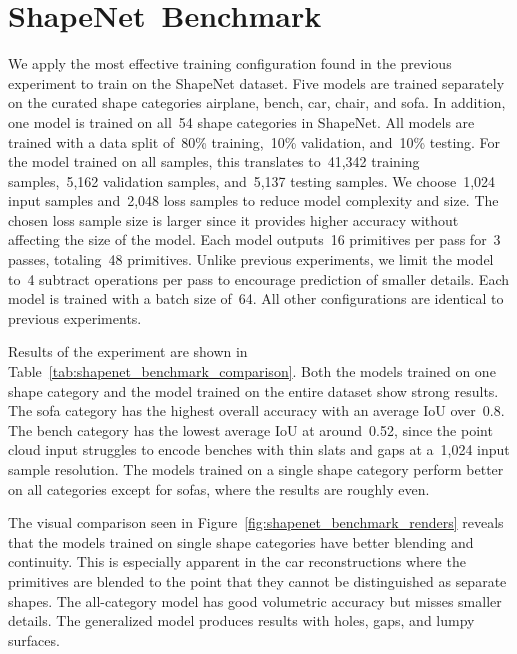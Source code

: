 \section{ShapeNet~Benchmark}
\label{sec:shapenet_experiment}

We apply the most effective training configuration found in the previous experiment to train on the ShapeNet dataset. Five models are trained separately on the curated shape categories airplane, bench, car, chair, and sofa. In addition, one model is trained on all~54 shape categories in ShapeNet. All models are trained with a data split of~80\% training,~10\% validation, and~10\% testing. For the model trained on all samples, this translates to~41,342 training samples,~5,162 validation samples, and~5,137 testing samples. We choose~1,024 input samples and~2,048 loss samples to reduce model complexity and size. The chosen loss sample size is larger since it provides higher accuracy without affecting the size of the model. Each model outputs~16 primitives per pass for~3 passes, totaling~48 primitives. Unlike previous experiments, we limit the model to~4 subtract operations per pass to encourage prediction of smaller details. Each model is trained with a batch size of~64. All other configurations are identical to previous experiments.

Results of the experiment are shown in Table~\ref{tab:shapenet_benchmark_comparison}. Both the models trained on one shape category and the model trained on the entire dataset show strong results. The sofa category has the highest overall accuracy with an average IoU over~0.8. The bench category has the lowest average IoU at around~0.52, since the point cloud input struggles to encode benches with thin slats and gaps at a~1,024 input sample resolution. The models trained on a single shape category perform better on all categories except for sofas, where the results are roughly even.

The visual comparison seen in Figure~\ref{fig:shapenet_benchmark_renders} reveals that the models trained on single shape categories have better blending and continuity. This is especially apparent in the car reconstructions where the primitives are blended to the point that they cannot be distinguished as separate shapes. The all-category model has good volumetric accuracy but misses smaller details. The generalized model produces results with holes, gaps, and lumpy surfaces.


